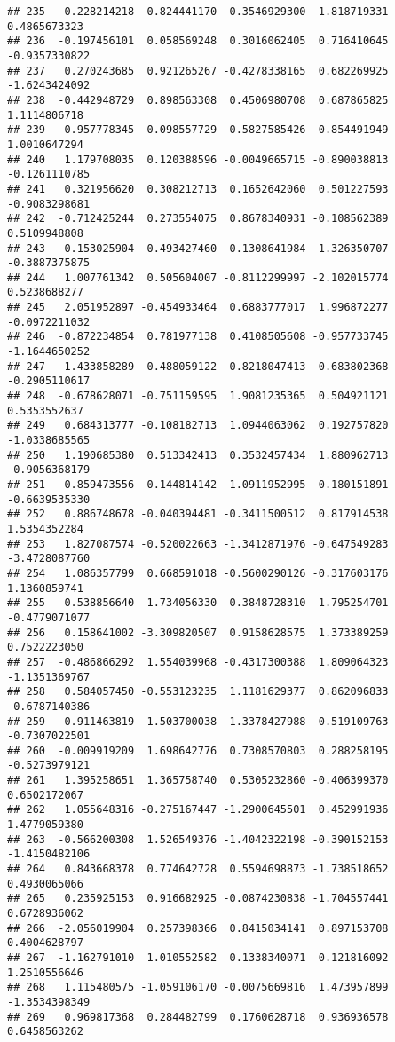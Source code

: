 \documentclass[
]{article}
\begin{document}
\begin{verbatim}
## 235   0.228214218  0.824441170 -0.3546929300  1.818719331  0.4865673323
## 236  -0.197456101  0.058569248  0.3016062405  0.716410645 -0.9357330822
## 237   0.270243685  0.921265267 -0.4278338165  0.682269925 -1.6243424092
## 238  -0.442948729  0.898563308  0.4506980708  0.687865825  1.1114806718
## 239   0.957778345 -0.098557729  0.5827585426 -0.854491949  1.0010647294
## 240   1.179708035  0.120388596 -0.0049665715 -0.890038813 -0.1261110785
## 241   0.321956620  0.308212713  0.1652642060  0.501227593 -0.9083298681
## 242  -0.712425244  0.273554075  0.8678340931 -0.108562389  0.5109948808
## 243   0.153025904 -0.493427460 -0.1308641984  1.326350707 -0.3887375875
## 244   1.007761342  0.505604007 -0.8112299997 -2.102015774  0.5238688277
## 245   2.051952897 -0.454933464  0.6883777017  1.996872277 -0.0972211032
## 246  -0.872234854  0.781977138  0.4108505608 -0.957733745 -1.1644650252
## 247  -1.433858289  0.488059122 -0.8218047413  0.683802368 -0.2905110617
## 248  -0.678628071 -0.751159595  1.9081235365  0.504921121  0.5353552637
## 249   0.684313777 -0.108182713  1.0944063062  0.192757820 -1.0338685565
## 250   1.190685380  0.513342413  0.3532457434  1.880962713 -0.9056368179
## 251  -0.859473556  0.144814142 -1.0911952995  0.180151891 -0.6639535330
## 252   0.886748678 -0.040394481 -0.3411500512  0.817914538  1.5354352284
## 253   1.827087574 -0.520022663 -1.3412871976 -0.647549283 -3.4728087760
## 254   1.086357799  0.668591018 -0.5600290126 -0.317603176  1.1360859741
## 255   0.538856640  1.734056330  0.3848728310  1.795254701 -0.4779071077
## 256   0.158641002 -3.309820507  0.9158628575  1.373389259  0.7522223050
## 257  -0.486866292  1.554039968 -0.4317300388  1.809064323 -1.1351369767
## 258   0.584057450 -0.553123235  1.1181629377  0.862096833 -0.6787140386
## 259  -0.911463819  1.503700038  1.3378427988  0.519109763 -0.7307022501
## 260  -0.009919209  1.698642776  0.7308570803  0.288258195 -0.5273979121
## 261   1.395258651  1.365758740  0.5305232860 -0.406399370  0.6502172067
## 262   1.055648316 -0.275167447 -1.2900645501  0.452991936  1.4779059380
## 263  -0.566200308  1.526549376 -1.4042322198 -0.390152153 -1.4150482106
## 264   0.843668378  0.774642728  0.5594698873 -1.738518652  0.4930065066
## 265   0.235925153  0.916682925 -0.0874230838 -1.704557441  0.6728936062
## 266  -2.056019904  0.257398366  0.8415034141  0.897153708  0.4004628797
## 267  -1.162791010  1.010552582  0.1338340071  0.121816092  1.2510556646
## 268   1.115480575 -1.059106170 -0.0075669816  1.473957899 -1.3534398349
## 269   0.969817368  0.284482799  0.1760628718  0.936936578  0.6458563262

\end{verbatim}
\end{document}
